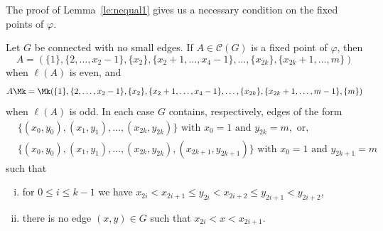 The proof of Lemma~\ref{le:nequal1} gives us a necessary condition on the fixed points of $\varphi$.

\begin{lemma}\label{le:fixshape} Let $G$ be connected with no small edges.
 If $A\in \mathcal{C}(G)$ is a fixed point of $\varphi$, then 
 $$
 A=(\{{1}\},\{2,\ldots,x_2-1\},\{x_2\},\{x_2+1,\ldots,x_4-1\},\ldots,\{x_{2k}\},\{x_{2k}+1,\ldots,m\})
 $$
 when $\ell(A)$ is even, and
 $$
 A\Mk = \Mk (\{1\},\{2,\ldots,x_2-1\},\{x_2\},\{x_2+1,\ldots,x_4-1\},\ldots,\{x_{2k}\},\{x_{2k}+1,\ldots,m-1\},\{m\})
 $$ 
when $\ell(A)$ is odd. In each case $G$ contains, respectively, edges of the form
\begin{align*}
& \big\{(x_0,y_0),(x_1,y_1),\ldots,(x_{2k},y_{2k})\big\}\text{ with }x_0=1 \text{ and }y_{2k} = m,\text{ or},\\
 &\big\{(x_0,y_0),(x_1,y_1),\ldots,(x_{2k},y_{2k}),(x_{2k+1},y_{2k+1})\big\}\text{ with }x_0=1 \text{ and }y_{2k+1} = m
 \end{align*}
 such that 
 \begin{enumerate}[(i)]
 \item %
\label{lemma2.12_i} for $0\le i\le k-1$ we have $x_{2i}<x_{2i+1}\le y_{2i}<x_{2i+2}\le y_{2i+1}<y_{2i+2}$,
 \item %
\label{lemma2.12_ii} there is no edge $(x,y)\in G$ such that $x_{2i}<x<x_{2i+1}$.
 \end{enumerate}
\end{lemma}

